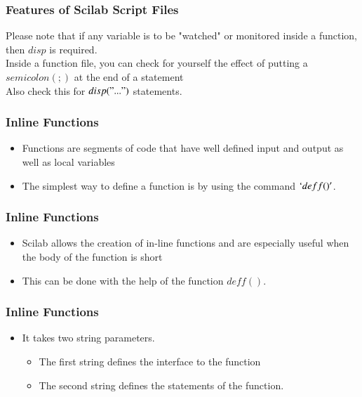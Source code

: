 \documentclass[17pt]{beamer}
\begin{document}
\begin{frame}[fragile]
\frametitle{Features of Scilab Script Files}

Please note that if any variable is to be "watched" or monitored inside a function, then $disp$ is required.\\\pause
\vspace{0.3cm}
Inside a function file, you can check for yourself the effect of putting a $semicolon ( ; )$ at the end of a statement\\\pause
\vspace{0.3cm}
 Also check this for $disp("..." )$ statements.

\end{frame}


\begin{frame}
\frametitle{Inline Functions}
\begin{itemize}
\item<+-|alert@+> Functions are segments of code that have well defined input and output as well as local variables
\item<+-|alert@+> The simplest way to define a function is by using the command $`deff()'$.
\end{itemize}
\end{frame}

\begin{frame}
\frametitle{Inline Functions}
\begin{itemize}
\item<+-|alert@+> Scilab allows the creation of in-line functions and are especially useful when the body of the function is short
\item<+-|alert@+> This can be done with the help of the function $deff()$.
\end{itemize}
\end{frame}

\begin{frame}[fragile]
\frametitle{Inline Functions}
\begin{itemize}
\item<+-|alert@+> It takes two string parameters.
\begin{itemize}
\item<+-|alert@+> The first string defines the interface to the function
\item<+-|alert@+> The second string defines the statements of the function.
\end{itemize}
\end{itemize}
\end{frame}
\end{document}
